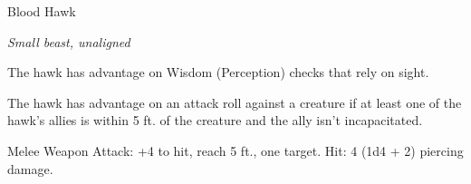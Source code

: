 \begin{monsterbox}{Blood Hawk}
\begin{hangingpar}
\textit{Small beast, unaligned}
\end{hangingpar}
\dndline%
\basics[%
armorclass = 12,
hitpoints = 2d6,
speed = {10 ft., fly 60 ft.}
]
\dndline%
\stats[%
STR = \stat{6},
DEX = \stat{14},
CON = \stat{10},
INT = \stat{3},
WIS = \stat{14},
CHA = \stat{5}
]
\dndline%
\details[%
skills={Perception +4, },
damageimmunities={},
savingthrows={},
conditionimmunities={},
damageresistances={},
damagevulnerabilities={},
senses={passive Perception 14},
challenge=1/8
]
\dndline%
\begin{monsteraction}
The hawk has advantage on Wisdom (Perception) checks that rely on sight.
\end{monsteraction}
\begin{monsteraction}
The hawk has advantage on an attack roll against a creature if at least one of the hawk's allies is within 5 ft. of the creature and the ally isn't incapacitated.
\end{monsteraction}
\begin{monsteraction}[Beak]
Melee Weapon Attack: +4 to hit, reach 5 ft., one target. Hit: 4 (1d4 + 2) piercing damage.
\end{monsteraction}
\end{monsterbox}